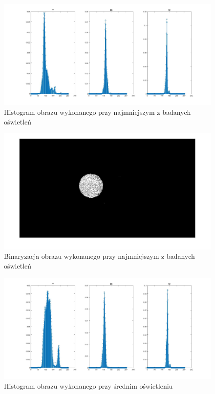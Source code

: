 \begin{figure}[h]
	\centering
	\includegraphics[width=\textwidth]{hist1.jpg}
	\caption{Histogram obrazu wykonanego przy najmniejszym z badanych oświetleń}
	\label{fig:hist1}
\end{figure}
\begin{figure}[h]
	\centering
	\includegraphics[width=\textwidth]{bin1.jpg}
	\caption{Binaryzacja obrazu wykonanego przy najmniejszym z badanych oświetleń}
	\label{fig:bin1}
\end{figure}
\begin{figure}[h]
	\centering
	\includegraphics[width=\textwidth]{hist2.jpg}
	\caption{Histogram obrazu wykonanego przy średnim oświetleniu}
	\label{fig:hist2}
\end{figure}
